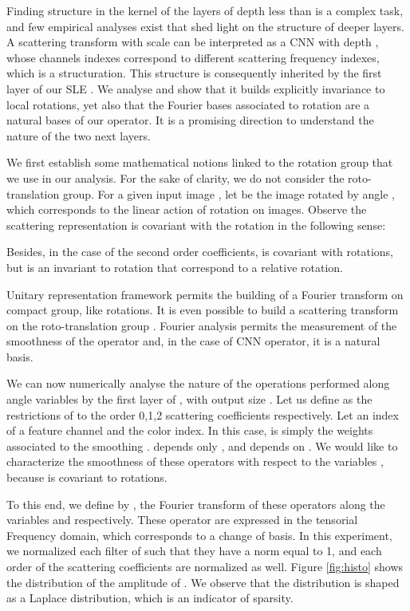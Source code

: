 \documentclass[10pt,twocolumn,letterpaper]{article}
\begin{document}
Finding structure in the kernel of the layers of depth less than  \cite{waldspurger2015these,zeiler2014visualizing} is  a complex task, and few empirical analyses exist that shed light on the structure \cite{jacobsen2017multiscale} of deeper layers. A scattering transform with scale  can be interpreted as a CNN with depth  \cite{oyallon2015deep}, whose  channels indexes correspond to different scattering frequency indexes, which is a structuration. This structure is consequently inherited by the first layer  of our SLE . We analyse  and show that it builds explicitly invariance to local rotations, yet also that the Fourier bases associated to rotation are a natural bases of our operator. It is a promising direction to understand the nature of the two next layers.

We first establish some mathematical notions linked to the rotation group that we use in our analysis. For the sake of clarity, we do not consider the roto-translation group.
For a given input image , let  be the image  rotated by angle , which corresponds to  the linear action of rotation on images. Observe the scattering representation is  covariant with the rotation in the following sense:

Besides, in the case of the second order coefficients,  is covariant with rotations, but  is an invariant to rotation that correspond to a relative rotation. 

Unitary representation framework \cite{sugiura1990unitary} permits the building of a Fourier transform on compact group, like rotations. It is even possible to build a scattering transform on the roto-translation group \cite{sifre2013rotation}. Fourier analysis permits the measurement of the smoothness of the operator and, in the case of CNN operator, it is a natural basis.





We can now numerically analyse the nature of the operations performed along angle variables by the first layer  of , with output size . Let us define as  the restrictions of  to the order 0,1,2 scattering coefficients respectively. Let  an index of a feature channel and  the color index. In this case,  is simply the weights associated to the smoothing .  depends only , and  depends on . We would like to characterize the smoothness of these operators with respect to the variables , because  is covariant to rotations.

To this end, we define by ,  the Fourier transform of these operators along the variables  and  respectively. These operator are expressed in the tensorial Frequency domain, which corresponds to a change of basis. In this experiment, we normalized each filter of  such that they have a  norm equal to 1, and each order of the scattering coefficients are normalized as well. Figure \ref{fig:histo} shows the distribution of the amplitude of . We observe that the distribution is shaped as a Laplace distribution, which is an indicator of sparsity. 
\end{document}
